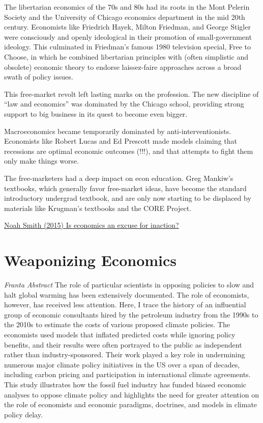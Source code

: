 \documentclass[
]{book}
\begin{document}
The libertarian economics of the 70s and 80s had its roots in the Mont Pelerin Society and the University of Chicago economics department in the mid 20th century. Economists like Friedrich Hayek, Milton Friedman, and George Stigler were consciously and openly ideological in their promotion of small-government ideology. This culminated in Friedman's famous 1980 television special, Free to Choose, in which he combined libertarian principles with (often simplistic and obsolete) economic theory to endorse laissez-faire approaches across a broad swath of policy issues.

This free-market revolt left lasting marks on the profession. The new discipline of ``law and economics'' was dominated by the Chicago school, providing strong support to big business in its quest to become even bigger.

Macroeconomics became temporarily dominated by anti-interventionists. Economists like Robert Lucas and Ed Prescott made models claiming that recessions are optimal economic outcomes (!!!), and that attempts to fight them only make things worse.

The free-marketers had a deep impact on econ education. Greg Mankiw's textbooks, which generally favor free-market ideas, have become the standard introductory undergrad textbook, and are only now starting to be displaced by materials like Krugman's textbooks and the CORE Project.

\href{https://noahpinion.substack.com/p/is-economics-an-excuse-for-inaction}{Noah Smith (2015) Is economics an excuse for inaction?}

\hypertarget{weaponizing-economics}{%
\section{Weaponizing Economics}\label{weaponizing-economics}}

\emph{Franta Abstract}
The role of particular scientists in opposing policies to slow and halt global
warming has been extensively documented. The role of economists, however,
has received less attention. Here, I trace the history of an influential group of
economic consultants hired by the petroleum industry from the 1990s to the
2010s to estimate the costs of various proposed climate policies. The economists
used models that inflated predicted costs while ignoring policy benefits,
and their results were often portrayed to the public as independent rather than
industry-sponsored. Their work played a key role in undermining numerous
major climate policy initiatives in the US over a span of decades, including
carbon pricing and participation in international climate agreements. This study
illustrates how the fossil fuel industry has funded biased economic analyses to
oppose climate policy and highlights the need for greater attention on the role
of economists and economic paradigms, doctrines, and models in climate
policy delay.
\end{document}
